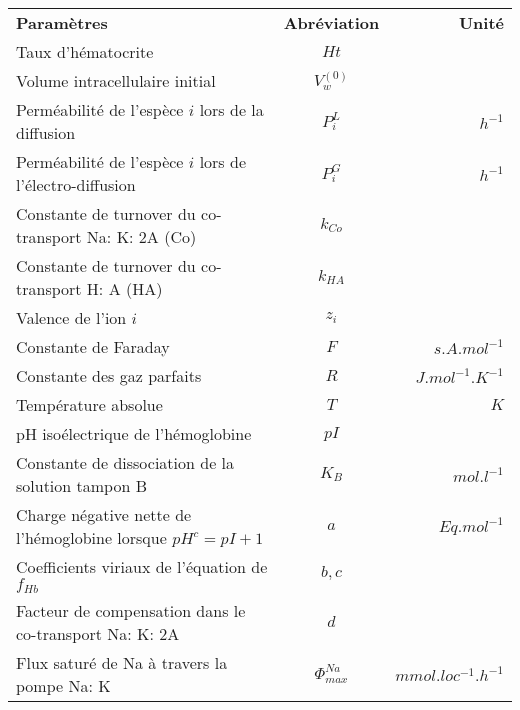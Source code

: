 \documentclass[a4paper,fleqn]{article}
\begin{document}
\begin{tabular}{p{8cm}cr}

\textbf{Paramètres}                                             & \textbf{Abréviation}     & \textbf{Unité}      \\
Taux d'hématocrite                                             & $Ht$                                           \\
Volume intracellulaire initial                                 & $V_{w}^{\left(0\right)}$                       \\
Perméabilité de l'espèce $i$ lors de la diffusion                  & $P_{i}^{L}$              & $h^{-1}$            \\
Perméabilité de l'espèce $i$ lors de l'électro-diffusion            & $P_{i}^{G}$              & $h^{-1}$            \\
Constante de turnover du co-transport Na: K: 2A (Co)            & $k_{Co}$                                       \\
Constante de turnover du co-transport H: A (HA)                 & $k_{HA}$                                       \\
Valence de l'ion $i$                                             & $z_i$                                          \\
Constante de Faraday                                           & $F$                      & $s.A.mol^{-1}$      \\
Constante des gaz parfaits                                     & $R$                      & $J.mol^{-1}.K^{-1}$ \\
Température absolue                                            & $T$                      & $K$                 \\
pH isoélectrique de l'hémoglobine                              & $pI$                                           \\
Constante de dissociation de la solution tampon B              & $K_B$                    & $mol.l^{-1}$        \\
Charge négative nette de l'hémoglobine lorsque $pH^c = pI + 1$ & $a$  & $Eq.mol^{-1}$  \\
Coefficients viriaux de l'équation de $f_{Hb}$                 & $b, c$                   &                     \\
Facteur de compensation dans le co-transport Na: K: 2A          & $d$                      &                     \\
Flux saturé de Na à travers la pompe Na: K                   & $\Phi_{max}^{Na}$        & $mmol.loc^{-1}.h^{-1}$ \\

\end{tabular}
\end{document}
